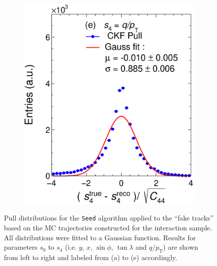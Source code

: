 \begin{figure}[t]
\begin{subfigure}{0.32\textwidth}
         \includegraphics[width=\textwidth]{figures/ch5-KF_NDGAr/FullSample/Int/Units/Unit4Seed.eps}
         \caption{}
         \label{fig:resp4SeedGAr_Int}
     \end{subfigure}
        \caption[Pull distributions for the \texttt{Seed} algorithm applied to the \enquote{fake tracks} constructed for the interaction sample.]{Pull distributions for the \texttt{Seed} algorithm applied to the \enquote{fake tracks} based on the MC trajectories constructed for the interaction sample. All distributions were fitted to a Gaussian function. Results for parameters $s_0$ to $s_4$ (i.e. $y$, $x$, $\sin\phi$, $\tan\lambda$ and $q/p_{\text{T}}$) are shown from left to right and labeled from (a) to (e) accordingly. }
        \label{fig:UnitGAr_Int}
\end{figure}

